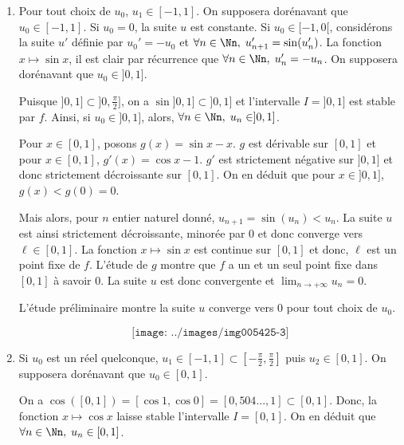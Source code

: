 {{\begin{enumerate}
Donc, il existe un rang $n_0$ tel que $u_{n_0}\leq-1$ et la suite $u$ n'est pas définie à partir d'un certain rang.

En résumé,

si $u_0\in]0,+\infty[$, la suite $u$ est strictement décroissante, convergente et $\lim_{n\rightarrow +\infty}u_n=0$,

si $u_0=0$, la suite $u$ est constante,

et si $u_0\in]-1,0[$, la suite $u$ n'est pas définie à partir d'un certain rang.

$$\texttt{[image: ../images/img005425-2]}$$


\item  Pour tout choix de $u_0$, $u_1\in[-1,1]$. On supposera dorénavant que $u_0\in[-1,1]$. Si $u_0=0$, la suite $u$ est constante. Si $u_0\in[-1,0[$, considérons la suite $u'$ définie par $u_0'=-u_0$ et $\forall n\in\Nn,\;u_{n+1}'=\sin(u_n')$. La fonction $x\mapsto\sin x$, il est clair par récurrence que $\forall n\in\Nn,\;u_n'=-u_n$. On supposera dorénavant que $u_0\in]0,1]$.

Puisque $]0,1]\subset]0,\frac{\pi}{2}]$, on a $\sin]0,1]\subset]0,1]$ et l'intervalle $I=]0,1]$ est stable par $f$. Ainsi, si $u_0\in]0,1]$, alors, $\forall n\in\Nn,\;u_n\in]0,1]$.

Pour $x\in[0,1]$, posons $g(x)=\sin x-x$. $g$ est dérivable sur $[0,1]$ et pour $x\in[0,1]$, $g'(x)=\cos x-1$. $g'$ est strictement négative sur $]0,1]$ et donc strictement décroissante sur $[0,1]$. On en déduit que pour $x\in]0,1]$, $g(x)<g(0)=0$.

Mais alors, pour $n$ entier naturel donné, $u_{n+1}=\sin(u_n)<u_n$. La suite $u$ est ainsi strictement décroissante, minorée par $0$ et donc converge vers $\ell\in[0,1]$. La fonction $x\mapsto\sin x$ est continue sur $[0,1]$ et donc, $\ell$ est un point fixe de $f$. L'étude de $g$ montre que $f$ a un et un seul point fixe dans $[0,1]$ à savoir $0$. La suite $u$ est donc convergente et $\lim_{n\rightarrow +\infty}u_n=0$.

L'étude préliminaire montre la suite $u$ converge vers $0$ pour tout choix de $u_0$.

$$\texttt{[image: ../images/img005425-3]}$$


\item  Si $u_0$ est un réel quelconque, $u_1\in[-1,1]\subset[-\frac{\pi}{2},\frac{\pi}{2}]$ puis $u_2\in[0,1]$. On supposera dorénavant que $u_0\in[0,1]$.

On a $\cos([0,1])=[\cos 1,\cos0]=[0,504...,1]\subset[0,1]$. Donc, la fonction $x\mapsto\cos x$ laisse stable l'intervalle $I=[0,1]$. On en déduit que $\forall n\in\Nn,\;u_n\in[0,1]$.


\end{enumerate}}}
